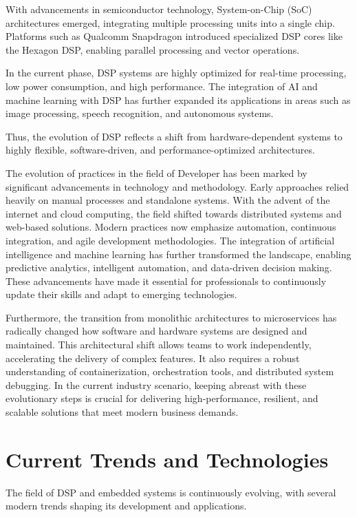 \documentclass[12pt,a4paper]{report}
\begin{document}
With advancements in semiconductor technology, System-on-Chip (SoC) architectures emerged, integrating multiple processing units into a single chip. Platforms such as Qualcomm Snapdragon introduced specialized DSP cores like the Hexagon DSP, enabling parallel processing and vector operations.


In the current phase, DSP systems are highly optimized for real-time processing, low power consumption, and high performance. The integration of AI and machine learning with DSP has further expanded its applications in areas such as image processing, speech recognition, and autonomous systems.


Thus, the evolution of DSP reflects a shift from hardware-dependent systems to highly flexible, software-driven, and performance-optimized architectures.


The evolution of practices in the field of Developer has been marked by significant advancements in technology and methodology. Early approaches relied heavily on manual processes and standalone systems. With the advent of the internet and cloud computing, the field shifted towards distributed systems and web-based solutions. Modern practices now emphasize automation, continuous integration, and agile development methodologies. The integration of artificial intelligence and machine learning has further transformed the landscape, enabling predictive analytics, intelligent automation, and data-driven decision making. These advancements have made it essential for professionals to continuously update their skills and adapt to emerging technologies.


Furthermore, the transition from monolithic architectures to microservices has radically changed how software and hardware systems are designed and maintained. This architectural shift allows teams to work independently, accelerating the delivery of complex features. It also requires a robust understanding of containerization, orchestration tools, and distributed system debugging. In the current industry scenario, keeping abreast with these evolutionary steps is crucial for delivering high-performance, resilient, and scalable solutions that meet modern business demands.


\section{Current Trends and Technologies}

The field of DSP and embedded systems is continuously evolving, with several modern trends shaping its development and applications.
\end{document}
